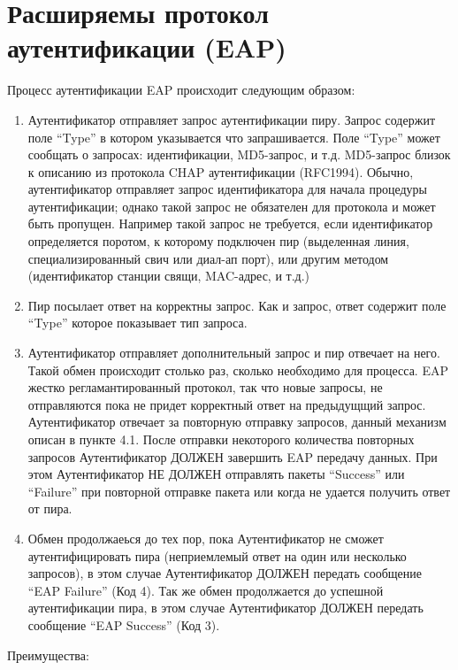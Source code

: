 \section{Расширяемы протокол аутентификации (EAP)}

Процесс аутентификации EAP происходит следующим образом:

\begin{enumerate}
\item Аутентификатор отправляет запрос аутентификации пиру. Запрос содержит поле ``Type'' в котором указывается что запрашивается. Поле ``Type'' может сообщать о запросах: идентификации, MD5-запрос, и т.д. MD5-запрос близок к описанию из протокола CHAP аутентификации (RFC1994). Обычно, аутентификатор отправляет запрос идентификатора для начала процедуры аутентификации; однако такой запрос не обязателен для протокола и может быть пропущен. Например такой запрос не требуется, если идентификатор определяется поротом, к которому подключен пир (выделенная линия, специализированный свич или диал-ап порт), или другим методом (идентификатор станции свящи, MAC-адрес, и т.д.)
\item Пир посылает ответ на корректны запрос. Как и запрос, ответ содержит поле ``Type'' которое показывает тип запроса.
\item Аутентификатор отправляет дополнительный запрос и пир отвечает на него. Такой обмен происходит столько раз, сколько необходимо для процесса. EAP жестко регламантированный протокол, так что новые запросы, не отправляются пока не придет корректный ответ на предыдущщий запрос. Аутентификатор отвечает за повторную отправку запросов, данный механизм описан в пункте 4.1. После отправки некоторого количества повторных запросов Аутентификатор ДОЛЖЕН завершить EAP передачу данных. При этом Аутентификатор НЕ ДОЛЖЕН отправлять пакеты ``Success'' или ``Failure'' при повторной отправке пакета или когда не удается получить ответ от пира.
\item Обмен продолжаеься до тех пор, пока Аутентификатор не сможет аутентифицировать пира (неприемлемый ответ на один или несколько запросов), в этом случае Аутентификатор ДОЛЖЕН передать сообщение ``EAP Failure'' (Код 4). Так же обмен продолжается до успешной аутентификации пира, в этом случае Аутентификатор ДОЛЖЕН передать сообщение ``EAP Success'' (Код 3).
\end{enumerate}

Преимущества:

